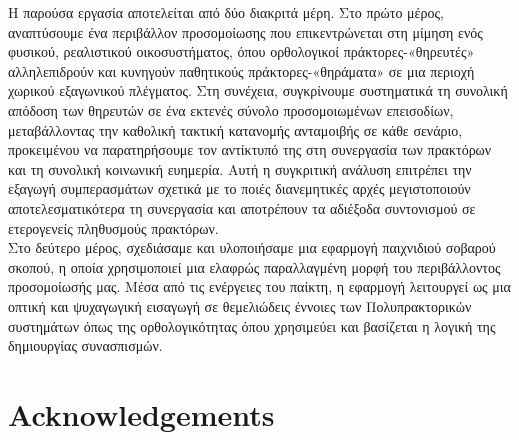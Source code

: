 \documentclass[12pt,a4paper]{report}
\begin{document}
	Η παρούσα εργασία αποτελείται από δύο διακριτά μέρη. Στο πρώτο μέρος, αναπτύσουμε ένα περιβάλλον προσομοίωσης που επικεντρώνεται στη μίμηση ενός φυσικού, ρεαλιστικού οικοσυστήματος, όπου ορθολογικοί πράκτορες-«θηρευτές» αλληλεπιδρούν και κυνηγούν παθητικούς πράκτορες-«θηράματα» σε μια περιοχή χωρικού εξαγωνικού πλέγματος. Στη συνέχεια, συγκρίνουμε συστηματικά τη συνολική απόδοση των θηρευτών σε ένα εκτενές σύνολο προσομοιωμένων επεισοδίων, μεταβάλλοντας την καθολική τακτική κατανομής ανταμοιβής σε κάθε σενάριο, προκειμένου να παρατηρήσουμε τον αντίκτυπό της στη συνεργασία των πρακτόρων και τη συνολική κοινωνική ευημερία. Αυτή η συγκριτική ανάλυση επιτρέπει την εξαγωγή συμπερασμάτων σχετικά με το ποιές διανεμητικές αρχές μεγιστοποιούν αποτελεσματικότερα τη συνεργασία και αποτρέπουν τα αδιέξοδα συντονισμού σε ετερογενείς πληθυσμούς πρακτόρων. \\
	
	Στο δεύτερο μέρος, σχεδιάσαμε και υλοποιήσαμε μια εφαρμογή παιχνιδιού σοβαρού σκοπού, η οποία χρησιμοποιεί μια ελαφρώς παραλλαγμένη μορφή του περιβάλλοντος προσομοίωσής μας. Μέσα από τις ενέργειες του παίκτη, η εφαρμογή λειτουργεί ως μια οπτική και ψυχαγωγική εισαγωγή σε θεμελιώδεις έννοιες των Πολυπρακτορικών συστημάτων όπως της ορθολογικότητας όπου χρησιμεύει και βασίζεται η λογική της δημιουργίας συνασπισμών.
	
	\chapter*{Acknowledgements}
	
	
	\tableofcontents
	\newpage
	
	\listoffigures
	\listoftables
	\listofalgorithms
	\newpage
	
	\clearpage
	
\end{document}
